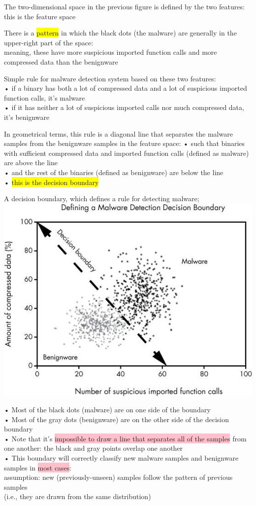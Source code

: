 \documentclass[]{project_plan}
\begin{document}
The two-dimensional space in the previous figure is defined by the two features:\\
this is the feature space

There is a \colorbox{yellow}{pattern} in which the black dots (the malware) are generally in the upper-right part of the space:\\
meaning, these have more suspicious imported function calls and more compressed data than the benignware

Simple rule for malware detection system based on these two features:\\
• if a binary has both a lot of compressed data and a lot of suspicious imported function calls, it’s malware\\
• if it has neither a lot of suspicious imported calls nor much compressed data, it’s benignware


In geometrical terms, this rule is a diagonal line that separates the
malware samples from the benignware samples in the feature space:
• such that binaries with sufficient compressed data and imported function calls (defined as malware) are above the line\\
• and the rest of the binaries (defined as benignware) are below the line\\
• \colorbox{yellow}{this is the decision boundary}

A decision boundary, which defines a rule for detecting malware;\\
\includegraphics[width=.6\linewidth]{ml pg44.png}

• Most of the black dots (malware) are on one side of the boundary\\
• Most of the gray dots (benignware) are on the other side of the decision
boundary\\
• Note that it’s \colorbox{pink}{impossible to draw a line that separates all of the samples} from one
another: the black and gray points overlap one another\\
• This boundary will correctly classify new malware samples and benignware samples
in \colorbox{pink}{most cases}:\\
assumption: new (previously-unseen) samples follow the pattern of previous samples\\
(i.e., they are drawn from the same distribution)
\end{document}
